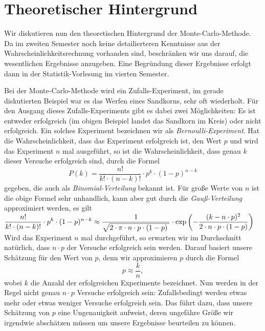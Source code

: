 \begin{center}
\colorbox{orange}{}
\end{center}

\section[Theory]{Theoretischer Hintergrund}
Wir diskutieren nun den theoretischen Hintergrund der Monte-Carlo-Methode.  Da im zweiten Semester noch
keine detailierteren Kenntnisse aus der Wahrscheinlichkeits\-rechnung vorhanden sind, beschr\"anken wir
uns darauf, die wesentlichen Ergebnisse anzugeben.  Eine Begr\"undung dieser Ergebnisse erfolgt dann
in der Statistik-Vorlesung im vierten Semester. 

Bei der Monte-Carlo-Methode wird ein Zufalls-Experiment, im gerade diskutierten Beispiel war es das Werfen
eines Sandkorns, sehr oft wiederholt.  F\"ur den Ausgang dieses Zufalls-Experiments gibt es dabei zwei
M\"oglichkeiten:  Es ist ent\-weder erfolgreich (im obigen Beispiel landet das Sandkorn im Kreis) oder nicht
erfolgreich.  Ein solches Experiment bezeichnen wir als \emph{Bernoulli-Experiment}.
 Hat die Wahrscheinlichkeit, dass das Experiment erfolgreich ist, den Wert $p$ und wird das
Experiment $n$ mal ausgef\"uhrt, so ist die Wahrscheinlichkeit, dass genau $k$ dieser Versuche erfolgreich sind,
durch die Formel
\[ P(k) = \frac{n!}{k! \cdot (n-k)!} \cdot p^k \cdot (1-p)^{n-k} \]
gegeben, die auch als \emph{Binomial-Verteilung} bekannt ist.  F\"ur gro{\ss}e Werte von $n$ ist die obige Formel
sehr unhandlich, kann aber gut durch die \emph{Gau{\ss}-Verteilung} approximiert werden, es gilt
\\[0.2cm]
\hspace*{0.8cm}
$\displaystyle\frac{n!}{k! \cdot (n-k)!} \cdot p^k \cdot (1-p)^{n-k} \approx  
   \frac{1}{\sqrt{2\cdot \pi \cdot n \cdot p \cdot (1-p)\;}} \cdot 
   \exp\left(-\frac{(k - n \cdot p)^2}{2 \cdot n \cdot p \cdot (1 - p)}\right)
$
\\[0.2cm]
Wird das Experiment $n$ mal durchgef\"uhrt, so erwarten wir im Durchschnitt nat\"urlich, dass $n \cdot p$ der
Versuche erfolgreich sein werden.  Darauf basiert unsere Sch\"atzung f\"ur den Wert von $p$, denn wir approximieren
$p$ durch die Formel
\[ p \approx \frac{k}{n}, \]
wobei $k$ die Anzahl der erfolgreichen Experimente bezeichnet.  Nun werden in der Regel nicht genau $n \cdot p$
Versuche erfolgreich sein: Zufallsbedingt werden etwas mehr oder etwas weniger Versuche
erfolgreich sein.  Das f\"uhrt dazu, dass unsere Sch\"atzung von $p$ eine Ungenauigkeit aufweist, deren ungef\"ahre
Gr\"o{\ss}e wir irgendwie absch\"atzen m\"ussen um unsere Ergebnisse beurteilen zu k\"onnen.

